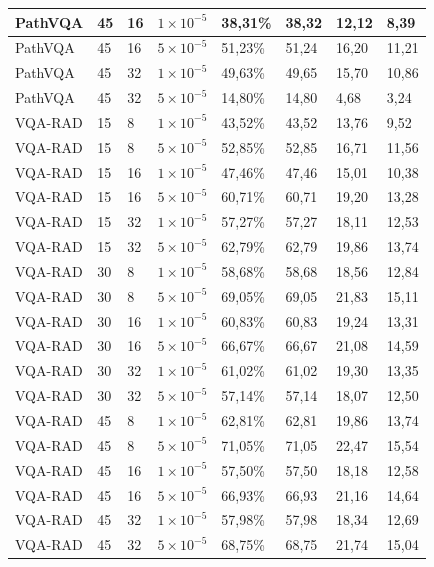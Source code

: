 \begin{longtable}[c]{|l|l|l|l|l|l|l|l|}
PathVQA & 45 & 16 & $1 \times 10^{-5}$ & 38,31\% & 38,32 & 12,12 & 8,39  \\ \hline
PathVQA & 45 & 16 & $5 \times 10^{-5}$ & 51,23\% & 51,24 & 16,20 & 11,21 \\ \hline
PathVQA & 45 & 32 & $1 \times 10^{-5}$ & 49,63\% & 49,65 & 15,70 & 10,86 \\ \hline
PathVQA & 45 & 32 & $5 \times 10^{-5}$ & 14,80\% & 14,80 & 4,68  & 3,24  \\ \hline
VQA-RAD & 15 & 8  & $1 \times 10^{-5}$ & 43,52\% & 43,52 & 13,76 & 9,52  \\ \hline
VQA-RAD & 15 & 8  & $5 \times 10^{-5}$ & 52,85\% & 52,85 & 16,71 & 11,56 \\ \hline
VQA-RAD & 15 & 16 & $1 \times 10^{-5}$ & 47,46\% & 47,46 & 15,01 & 10,38 \\ \hline
VQA-RAD & 15 & 16 & $5 \times 10^{-5}$ & 60,71\% & 60,71 & 19,20 & 13,28 \\ \hline
VQA-RAD & 15 & 32 & $1 \times 10^{-5}$ & 57,27\% & 57,27 & 18,11 & 12,53 \\ \hline
VQA-RAD & 15 & 32 & $5 \times 10^{-5}$ & 62,79\% & 62,79 & 19,86 & 13,74 \\ \hline
VQA-RAD & 30 & 8  & $1 \times 10^{-5}$ & 58,68\% & 58,68 & 18,56 & 12,84 \\ \hline
VQA-RAD & 30 & 8  & $5 \times 10^{-5}$ & 69,05\% & 69,05 & 21,83 & 15,11 \\ \hline
VQA-RAD & 30 & 16 & $1 \times 10^{-5}$ & 60,83\% & 60,83 & 19,24 & 13,31 \\ \hline
VQA-RAD & 30 & 16 & $5 \times 10^{-5}$ & 66,67\% & 66,67 & 21,08 & 14,59 \\ \hline
VQA-RAD & 30 & 32 & $1 \times 10^{-5}$ & 61,02\% & 61,02 & 19,30 & 13,35 \\ \hline
VQA-RAD & 30 & 32 & $5 \times 10^{-5}$ & 57,14\% & 57,14 & 18,07 & 12,50 \\ \hline
VQA-RAD & 45 & 8  & $1 \times 10^{-5}$ & 62,81\% & 62,81 & 19,86 & 13,74 \\ \hline
VQA-RAD & 45 & 8  & $5 \times 10^{-5}$ & 71,05\% & 71,05 & 22,47 & 15,54 \\ \hline
VQA-RAD & 45 & 16 & $1 \times 10^{-5}$ & 57,50\% & 57,50 & 18,18 & 12,58 \\ \hline
VQA-RAD & 45 & 16 & $5 \times 10^{-5}$ & 66,93\% & 66,93 & 21,16 & 14,64 \\ \hline
VQA-RAD & 45 & 32 & $1 \times 10^{-5}$ & 57,98\% & 57,98 & 18,34 & 12,69 \\ \hline
VQA-RAD & 45 & 32 & $5 \times 10^{-5}$ & 68,75\% & 68,75 & 21,74 & 15,04 \\ \hline
\end{longtable}


